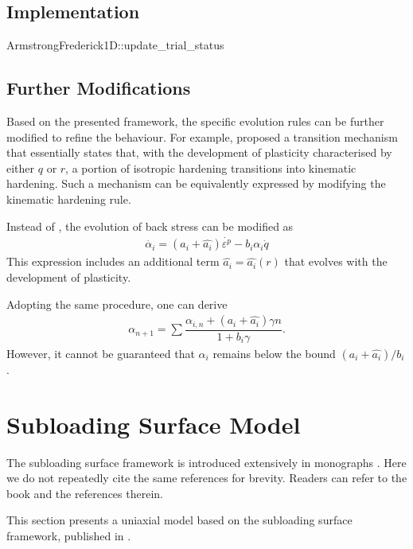 \subsection{Implementation}
\begin{cppcode}
ArmstrongFrederick1D::update_trial_status
\end{cppcode}
\subsection{Further Modifications}
Based on the presented framework, the specific evolution rules can be further modified to refine the behaviour.
For example, \cite{Xu2016} proposed a transition mechanism that essentially states that, with the development of plasticity characterised by either $q$ or $r$, a portion of isotropic hardening transitions into kinematic hardening.
Such a mechanism can be equivalently expressed by modifying the kinematic hardening rule.

Instead of , the evolution of back stress can be modified as
\begin{gather}
\dot{\alpha_i}=\left(a_i+\hat{a_i}\right)\dot{\varepsilon^p}-b_i\alpha_i\dot{q}
\end{gather}
This expression includes an additional term $\hat{a_i}=\hat{a_i}\left(r\right)$ that evolves with the development of plasticity.

Adopting the same procedure, one can derive
\begin{gather}
\alpha_{n+1}=\sum\dfrac{\alpha_{i,n}+\left(a_i+\hat{a_i}\right)\gamma{}n}{1+b_i\gamma}.
\end{gather}
However, it cannot be guaranteed that $\alpha_i$ remains below the bound $\left(a_i+\hat{a_i}\right)/b_i$.
\section{Subloading Surface Model}\label{sec:uniaxial_subloading}
The subloading surface framework is introduced extensively in monographs \cite{Hashiguchi2023}.
Here we do not repeatedly cite the same references for brevity.
Readers can refer to the book and the references therein.

This section presents a uniaxial model based on the subloading surface framework, published in \cite{Chang2025}.
